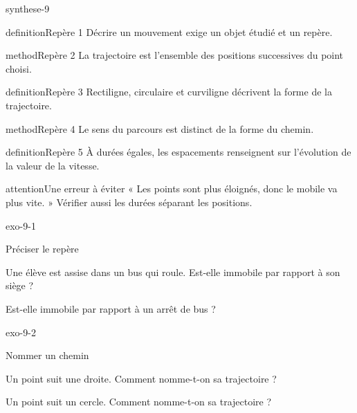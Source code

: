 \documentclass[12pt,twoside,openany]{book}
\begin{document}
\begin{pcFiche}{synthese-9}
\begin{pcEncadre}{definition}{Repère 1}
Décrire un mouvement exige un objet étudié et un repère.\par
\end{pcEncadre}
\begin{pcEncadre}{method}{Repère 2}
La trajectoire est l’ensemble des positions successives du point choisi.\par
\end{pcEncadre}
\begin{pcEncadre}{definition}{Repère 3}
Rectiligne, circulaire et curviligne décrivent la forme de la trajectoire.\par
\end{pcEncadre}
\begin{pcEncadre}{method}{Repère 4}
Le sens du parcours est distinct de la forme du chemin.\par
\end{pcEncadre}
\begin{pcEncadre}{definition}{Repère 5}
À durées égales, les espacements renseignent sur l’évolution de la valeur de la vitesse.\par
\end{pcEncadre}
\begin{pcEncadre}{attention}{Une erreur à éviter}
« Les points sont plus éloignés, donc le mobile va plus vite. » Vérifier aussi les durées séparant les positions.\par
\end{pcEncadre}
\end{pcFiche}
\clearpage{}
\begin{blocLivre}{exo-9-1}
\begin{exercice}[1]{Préciser le repère}
\begin{questions}
\item Une élève est assise dans un bus qui roule. Est-elle immobile par rapport à son siège ?
\item Est-elle immobile par rapport à un arrêt de bus ?
\end{questions}
\end{exercice}\end{blocLivre}
\begin{blocLivre}{exo-9-2}
\begin{exercice}[1]{Nommer un chemin}
\begin{questions}
\item Un point suit une droite. Comment nomme-t-on sa trajectoire ?
\item Un point suit un cercle. Comment nomme-t-on sa trajectoire ?
\end{questions}
\end{exercice}\end{blocLivre}
\end{document}
